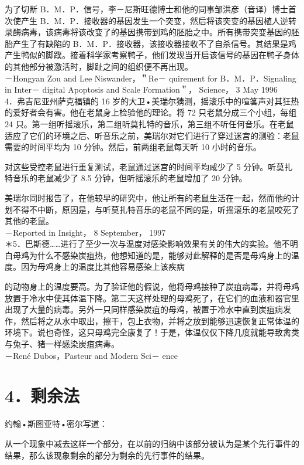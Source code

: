 为了切断 B．M．P．信号，李－尼斯旺德博士和他的同事邹洪彦（音译）博士首次使产生 B．M．P．接收器的基因发生一个突变，然后将该突变的基因植人逆转录酶病毒，该病毒将该改变了的基因携带到鸡的胚胎之中。所有携带突变基因的胚胎产生了有缺陷的 B．M．P．接收器，该接收器接收不了自杀信号。其结果是鸡产生鸭似的脚蹼。接着科学家考察鸭子，他们发现当开启该信号的基因在鸭子身体的其他部分被激活时，脚趾之间的组织便不再出现。\\
－Hongyan Zou and Lee Niswander，＂Re－ quirement for B．M．P．Signaling in Inter－ digital Apoptosis and Scale Formation＂， Science， 3 May 1996\\
4．弗吉尼亚州萨克福镇的 16 岁的大卫•美瑞尔猜测，摇滚乐中的喧笿声对其狂热的爱好者会有害。他在老鼠身上检验他的理论。将 72 只老鼠分成三个小组，每组 24 只。第一组听摇滚乐，第二组听莫扎特的音乐，第三组不听任何音乐。在老鼠适应了它们的环境之后、听音乐之前，美瑞尔对它们进行了穿过迷宫的测验：老鼠需要的时间平均为 10 分钟。然后，前两组老鼠每天听 10 小时的音乐。

对这些受控老鼠进行重复测试，老鼠通过迷宫的时间平均咸少了 5 分钟。听莫扎特音乐的老鼠减少了 8.5 分钟，但听摇滚乐的老鼠增加了 20 分钟。

美瑞尔同时报告了，在他较早的研究中，他让所有的老鼠生活在一起，然而他的计划不得不中断，原因是，与听莫扎特音乐的老鼠不同的是，听摇滚乐的老鼠咬死了其他的老鼠。\\
－Reported in Insight， 8 September， 1997\\
＊5．巴斯德……进行了至少一次与温度对感染影响效果有关的伟大的实验。他不明白母鸡为什么不感染炭疽热，他想知道的是，能够对此解释的是否是母鸡身上的温度。因为母鸡身上的温度比其他容易感染上该疾病

的动物身上的温度要高。为了验证他的假说，他将母鸡接种了炭疽病毒，并将母鸡放置于冷水中使其体温下降。第二天这样处理的母鸡死了，在它们的血液和器官里出现了大量的病毒。另外一只同样感染炭疽的母鸡，被置于冷水中直到炭疽病发作，然后将之从水中取出，擦干，包上衣物，并将之放到能够迅速恢复正常体温的环境下。说也奇怪，这只母鸡完全康复了！于是，体温仅仅下降几度就能导致禽类与兔子、猪一样感染炭疽病毒。\\
－René Dubos，Pasteur and Modern Sci－ ence

\section*{4．剩余法}
约翰•斯图亚特•密尔写道：

从一个现象中减去这样一个部分，在以前的归纳中该部分被认为是某个先行事件的结果，那么该现象剩余的部分为剩余的先行事件的结果。

